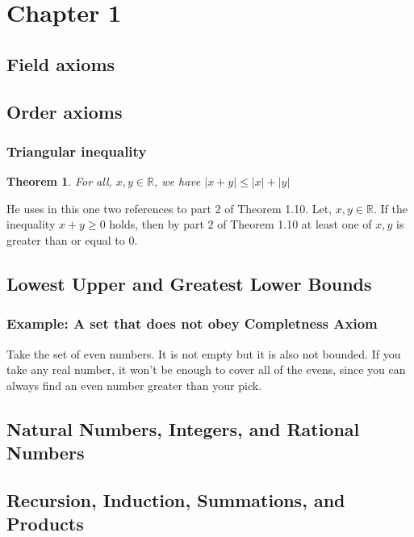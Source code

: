 \documentclass{article}
\newtheorem*{theorem}{Theorem}
\begin{document}
\section{Chapter 1}
\subsection{Field axioms}
\subsection{Order axioms}
\subsubsection{Triangular inequality}
\begin{theorem}
    For all, \(x, y \in \mathbb{R}\), we have \(|x + y| \leq |x| + |y|\)
\end{theorem}

He uses in this one two references to part 2 of Theorem 1.10. Let, \(x, y \in \mathbb{R}\). If the
inequality \(x + y \geq 0\) holds, then by part 2 of Theorem 1.10 at least one of \(x, y\) is greater than or equal to \(0\).

\subsection{Lowest Upper and Greatest Lower Bounds}
\subsubsection*{Example: A set that does not obey Completness Axiom}
Take the set of even numbers. It is not empty but it is also not bounded. If you take any real number, it won't be enough
to cover all of the evens, since you can always find an even number greater than your pick.
\subsection{Natural Numbers, Integers, and Rational Numbers}
\subsection{Recursion, Induction, Summations, and Products}
\end{document}
